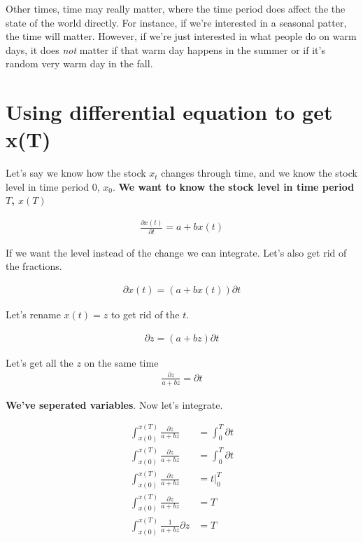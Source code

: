 \documentclass{article}
\begin{document}
Other times, time may really matter, where the time period does affect the the state of the world directly. For instance, if we're interested in a seasonal patter, the time will matter. However, if we're just interested in what people do on warm days, it does \textit{not} matter if that warm day happens in the summer or if it's random very warm day in the fall. 

\section{Using differential equation to get x(T)}

Let's say we know how the stock $x_t$ changes through time, and we know the stock level in time period $0$, $x_0$. \textbf{We want to know the stock level in time period $T$, $x(T)$}

\begin{align*}
    \frac{\partial x(t)}{\partial t} = a + bx(t)
\end{align*}

If we want the level instead of the change we can integrate. Let's also get rid of the fractions. 

\begin{align*}
    \partial x(t) = (a + b x(t)) \partial t
\end{align*}

Let's rename $x(t) = z$ to get rid of the $t$. 

\begin{align}
    \partial z = (a + b z) \partial t
\end{align}

Let's get all the $z$ on the same time 
\begin{align*}
    \frac{\partial z}{a + b z} = \partial t
\end{align*}

\textbf{We've seperated variables}. Now let's integrate. 

\begin{align*}
    \int_{x(0)}^{x(T)} \frac{\partial z}{a + b z} &= \int_0^T \partial t\\
     \int_{x(0)}^{x(T)} \frac{\partial z}{a + b z} &= \int_0^T \partial t\\
     \int_{x(0)}^{x(T)} \frac{\partial z}{a + b z} &= t|_0^T \\
     \int_{x(0)}^{x(T)} \frac{\partial z}{a + b z} &= T \\
     \int_{x(0)}^{x(T)} \frac{1}{a + b z} \partial z &= T
\end{align*}
\end{document}
